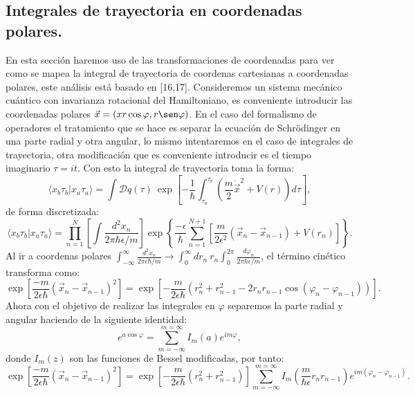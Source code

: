 \subsection{Integrales de trayectoria en coordenadas polares.}
En esta sección haremos uso de las transformaciones de coordenadas para ver como se mapea la integral de trayectoria de coordenas cartesianas a coordenadas polares, este análisis está basado en [16,17]. Consideremos un sistema mecánico cuántico con invarianza rotacional del Hamiltoniano, es conveniente introducir las coordenadas polares $\vec{x}=(x r\cos \varphi,r\sen \varphi)$. En el caso del formalismo de operadores el tratamiento que se hace es separar la ecuación de Schrödinger en una parte radial y otra angular, lo mismo intentaremos en el caso de integrales de trayectoria, otra modificación que es conveniente introducir es el tiempo imaginario $\tau=it$. Con esto la integral de trayectoria toma la forma:
\begin{equation}
\langle x_{b}\tau_{b}|x_{a}\tau_{a}\rangle=\int\mathcal{D}q(\tau)\ \exp\left[-\frac{1}{\hbar}\int_{\tau_{a}}^{\tau_{b}}\left(\frac{m}{2}\dot{\vec{x}}^{2}+V(r)\right)d\tau\right],
\end{equation}
de forma discretizada:
\begin{equation}
\langle x_{b}\tau_{b}|x_{a}\tau_{a}\rangle=\prod_{n=1}^{N}\left[\int\frac{d^{2}x_{n}}{2\pi\hbar\epsilon/m}\right]\exp\left\{ \frac{-\epsilon}{\hbar}\sum_{n=1}^{N+1}\left[\frac{m}{2\epsilon^{2}}(\vec{x}_{n}-\vec{x}_{n-1})+V(r_{n})\right]\right\} .
\end{equation}
Al ir a coordenas polares $\int_{-\infty}^{\infty}\frac{d^{2}x_{n}}{2\pi\epsilon\hbar/m}\to\int_{0}^{\infty}dr_{n}\ r_{n}\int_{0}^{2\pi}\frac{d\varphi_{n}}{2\pi\hbar\epsilon/m}$, el término cinético transforma como:
\begin{equation}
\exp\left[\frac{-m}{2\epsilon\hbar}(\vec{x}_{n}-\vec{x}_{n-1})^{2}\right]=\exp\left[-\frac{m}{2\epsilon\hbar}(r_{n}^{2}+r_{n-1}^{2}-2r_{n}r_{n-1}\cos(\varphi_{n}-\varphi_{n-1}))\right] .
\end{equation}
Ahora con el objetivo de realizar las integrales en $\varphi$ separemos la parte radial y angular haciendo de la siguiente identidad:
\begin{equation}
e^{a\cos\varphi}=\sum_{m=-\infty}^{m=\infty}I_{m}(a)e^{im\varphi},
\end{equation}
donde $I_m(z)$ son las funciones de Bessel modificadas, por tanto:
\begin{equation}
\exp\left[\frac{-m}{2\epsilon\hbar}(\vec{x}_{n}-\vec{x}_{n-1})^{2}\right]=\exp\left[-\frac{m}{2\epsilon\hbar}(r_{n}^{2}+r_{n-1}^{2})\right]\sum_{m=-\infty}^{m=\infty}I_{m}\left(\frac{m}{\hbar\epsilon}r_{n}r_{n-1}\right)e^{im(\varphi_{n}-\varphi_{n-1})} .
\end{equation}
